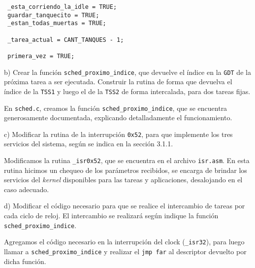 \begin{verbatim}
 _esta_corriendo_la_idle = TRUE;
 guardar_tanquecito = TRUE;
 _estan_todas_muertas = TRUE;
  
 _tarea_actual = CANT_TANQUES - 1;
  
 primera_vez = TRUE;
\end{verbatim}


\vspace*{0.5cm} \noindent



\noindent
b) Crear la funci\'on \verb|sched_proximo_indice|, que devuelve el \'indice en la \verb|GDT| de la pr\'oxima tarea a ser ejecutada. 
Construir la rutina de forma que devuelva el \'indice de la \verb|TSS1| y luego el de la \verb|TSS2| de forma intercalada, para 
dos tareas fijas.

\vspace*{0.3cm}

En \verb|sched.c|, creamos la funci\'on \verb|sched_proximo_indice|, que se encuentra generosamente documentada, explicando detalladamente 
el funcionamiento.

\vspace*{0.5cm} \noindent



\noindent
c) Modificar la rutina de la interrupci\'on \verb|0x52|, para que implemente los tres servicios del sistema, seg\'un se indica en la 
secci\'on 3.1.1. 


\vspace*{0.3cm}

Modificamos la rutina \verb|_isr0x52|, que se encuentra en el archivo \verb|isr.asm|. En esta rutina hicimos un chequeo de los par\'ametros 
recibidos, se encarga de brindar los servicios del \textit{kernel} disponibles para las tareas y aplicaciones, desalojando en el caso adecuado.

\vspace*{0.5cm} \noindent



\noindent
d) Modificar el c\'odigo necesario para que se realice el intercambio de tareas por cada ciclo de reloj. El intercambio se realizar\'a 
seg\'un indique la funci\'on \verb|sched_proximo_indice|. 


\vspace*{0.3cm}

Agregamos el c\'odigo necesario en la interrupci\'on del clock (\verb|_isr32|), para luego llamar a \verb|sched_proximo_indice| y 
realizar el \verb|jmp far| al descriptor devuelto por dicha funci\'on.

